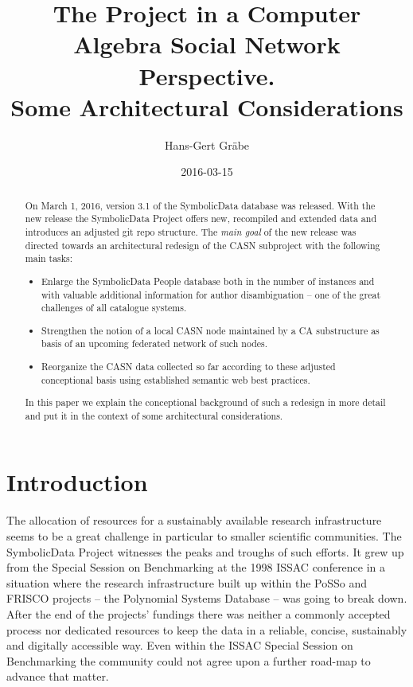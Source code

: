 \documentclass{llncs}
\title{The {\SD} Project in a Computer Algebra Social Network Perspective.\\
  Some Architectural Considerations}
\author{Hans-Gert Gr\"abe}
\institute{Leipzig University, Leipzig, Germany\\
\email{graebe@informatik.uni-leipzig.de}}
\date{2016-03-15}
\newcommand{\SD}{{\sc Symbo\-lic\-Data}}
\begin{document}
\maketitle

\begin{abstract}  
  On March 1, 2016, version 3.1 of the {\SD} data\-base was released. With the
  new release the {\SD} Project offers new, recompiled and extended data and
  introduces an adjusted git repo structure. The \emph{main goal} of the new
  release was directed towards an architectural redesign of the CASN
  subproject with the following main tasks:
\begin{itemize}
\item Enlarge the {\SD} People database both in the number of instances and
  with valuable additional information for author disambiguation -- one of the
  great challenges of all catalogue systems.
\item Strengthen the notion of a local CASN node maintained by a CA
  substructure as basis of an upcoming federated network of such nodes.
\item Reorganize the CASN data collected so far according to these adjusted
  conceptional basis using established semantic web best practices.
\end{itemize}
In this paper we explain the conceptional background of such a redesign in
more detail and put it in the context of some architectural considerations. 
\end{abstract}

\section{Introduction}
The allocation of resources for a sustainably available research
infrastructure seems to be a great challenge in particular to smaller
scientific communities. The {\SD} Project witnesses the peaks and troughs of
such efforts. It grew up from the Special Session on Benchmarking at the 1998
ISSAC conference in a situation where the research infrastructure built up
within the PoSSo \cite{PoSSo} and FRISCO \cite{FRISCO} projects -- the
Polynomial Systems Database -- was going to break down. After the end of the
projects' fundings there was neither a commonly accepted process nor dedicated
resources to keep the data in a reliable, concise, sustainably and digitally
accessible way. Even within the ISSAC Special Session on Benchmarking the
community could not agree upon a further road-map to advance that matter.
\end{document}
